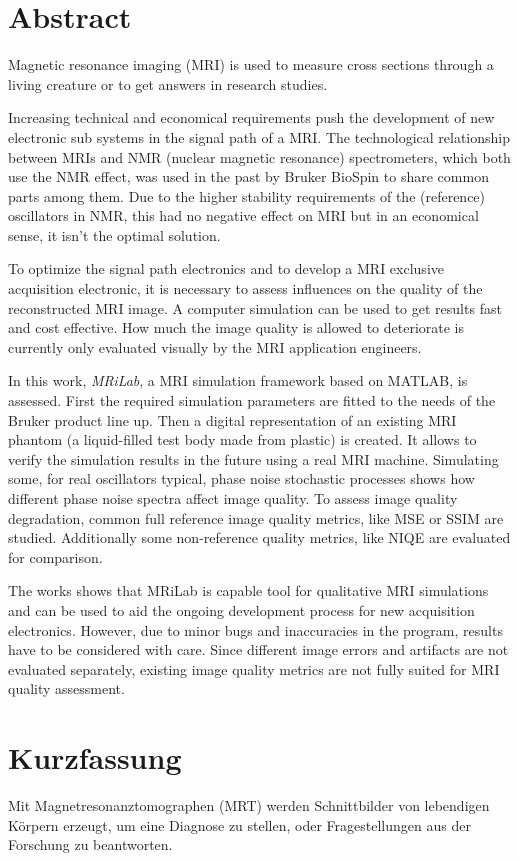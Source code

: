 \chapter*{Abstract}
Magnetic resonance imaging (MRI) is used to measure cross sections through a living creature or to get answers in research studies.

Increasing technical and economical requirements push the development of new electronic sub systems in the signal path of a MRI. The technological relationship between MRIs and NMR (nuclear magnetic resonance) spectrometers, which both use the NMR effect, was used in the past by Bruker BioSpin to share common parts among them.
Due to the higher stability requirements of the (reference) oscillators in NMR, this had no negative effect on MRI but in an economical sense, it isn't the optimal solution.

To optimize the signal path electronics and to develop a MRI exclusive acquisition electronic, it is necessary to assess influences on the quality of the reconstructed MRI image. A computer simulation can be used to get results fast and cost effective. How much the image quality is allowed to deteriorate is currently only evaluated visually by the MRI application engineers.

In this work, \textit{MRiLab}, a MRI simulation framework based on MATLAB, is assessed. First the required simulation parameters are fitted to the needs of the Bruker product line up. Then a digital representation of an existing MRI phantom (a liquid-filled test body made from plastic) is created. It allows to verify the simulation results in the future using a real MRI machine.
Simulating some, for real oscillators typical, phase noise stochastic processes shows how different phase noise spectra affect image quality. To assess image quality degradation, common full reference image quality metrics, like MSE or SSIM are studied. Additionally some non-reference quality metrics, like NIQE are evaluated for comparison.

The works shows that MRiLab is capable tool for qualitative MRI simulations and can be used to aid the ongoing development process for new acquisition electronics. However, due to minor bugs and inaccuracies in the program, results have to be considered with care. Since different image errors and artifacts are not evaluated separately, existing image quality metrics are not fully suited for MRI quality assessment.

\chapter*{Kurzfassung}
Mit Magnetresonanztomographen (MRT) werden Schnittbilder von lebendigen Körpern erzeugt, um eine Diagnose zu stellen, oder Fragestellungen aus der Forschung zu beantworten.

